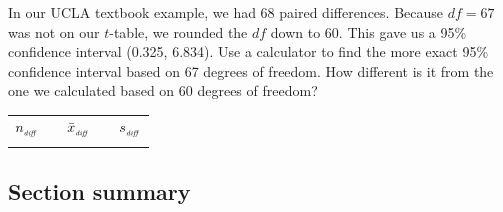 \begin{exercisewrap}
\begin{nexercise}
In our UCLA textbook example, we had 68 paired differences.  Because $df=67$ was not on our $t$-table, we rounded the $df$ down to 60.  This gave us a 95\% confidence interval (0.325, 6.834).  Use a calculator to find the more exact 95\% confidence interval based on 67 degrees of freedom.  How different is it from the one we calculated based on 60 degrees of freedom?\footnotemark
\begin{center}
\begin{tabular}{ccccc}
\hline
$n_{_{\text{\emph{diff}}}}$	&\hspace{3mm}& $\bar{x}_{_{\text{\emph{diff}}}}$	&\hspace{3mm}& $s_{_{\text{\emph{diff}}}}$ \vspace{1mm}\\
\uclabookN{}  && \uclabookM{}  && \uclabookSD{} \\
\hline
\end{tabular}
\end{center}
\end{nexercise}
\end{exercisewrap}


\D{\newpage}

\subsection*{Section summary}

